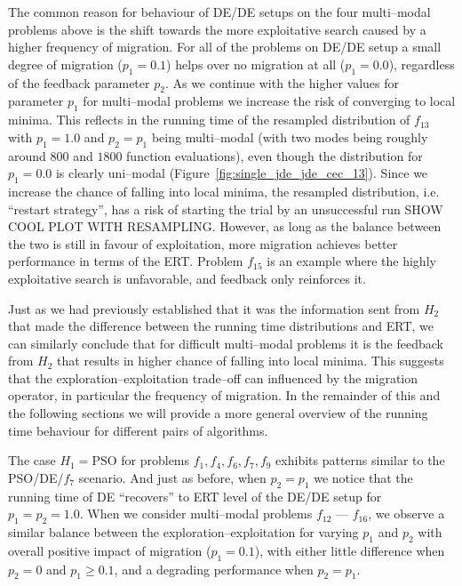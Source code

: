 \documentclass{sig-alternate}
\begin{document}
The common reason for behaviour of DE/DE setups on the four multi--modal problems above is the shift towards the more exploitative search caused by a higher frequency of migration.
For all of the problems on DE/DE setup a small degree of migration ($p_1=0.1$) helps over no migration at all ($p_1=0.0$), regardless of the feedback parameter $p_2$.
As we continue with the higher values for parameter $p_1$ for multi--modal problems we increase the risk of converging to local minima.
This reflects in the running time of the resampled distribution of $f_{13}$ with $p_1=1.0$ and $p_2=p_1$ being multi--modal (with two modes being roughly around $800$ and $1800$ function evaluations), even though the distribution for $p_1=0.0$ is clearly uni--modal (Figure~\ref{fig:single_jde_jde_cec_13}).
Since we increase the chance of falling into local minima, the resampled distribution, i.e. ``restart strategy'', has a risk of starting the trial by an unsuccessful run SHOW COOL PLOT WITH RESAMPLING.
However, as long as the balance between the two is still in favour of exploitation, more migration achieves better performance in terms of the ERT.
Problem $f_{15}$ is an example where the highly exploitative search is unfavorable, and feedback only reinforces it.

Just as we had previously established that it was the information sent from $H_2$ that made the difference between the running time distributions and ERT, we can similarly conclude that for difficult multi--modal problems it is the feedback from $H_2$ that results in higher chance of falling into local minima.
This suggests that the exploration--exploitation trade--off can influenced by the migration operator, in particular the frequency of migration.
In the remainder of this and the following sections we will provide a more general overview of the running time behaviour for different pairs of algorithms.

The case $H_1 = \mbox{PSO}$ for problems $f_1, f_4, f_6, f_7, f_9$ exhibits patterns similar to the PSO/DE/$f_7$ scenario.
And just as before, when $p_2 = p_1$ we notice that the running time of DE ``recovers'' to ERT level of the DE/DE setup for $p_1 = p_2 = 1.0$.
When we consider multi--modal problems $f_{12}$ --- $f_{16}$, we observe a similar balance between the exploration--exploitation for varying $p_1$ and $p_2$ with overall positive impact of migration ($p_1=0.1$), with either little difference when $p_2=0$ and $p_1 \geq 0.1$, and a degrading performance when $p_2=p_1$.
\end{document}

